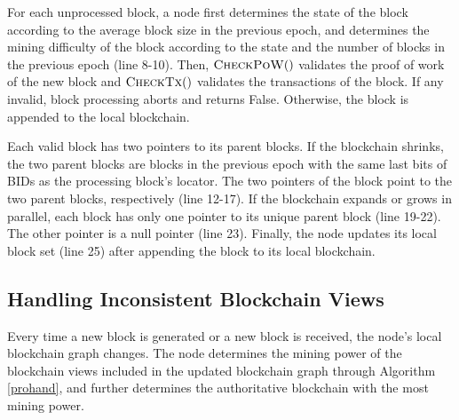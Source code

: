 \documentclass[10pt,journal,compsoc]{IEEEtran}
\renewcommand*\Call[2]{\textproc{#1}(#2)}
\begin{document}
	For each unprocessed block, a node first determines the state of the block according to the average block size in the previous epoch, and determines the mining difficulty of the block according to the state and the number of blocks in the previous epoch (line 8-10). 
	Then, $\Call{CheckPoW}{ } $ validates the proof of work of the new block and $\Call{CheckTx}{ }$ validates the transactions of the block. If any invalid, block processing aborts and returns False. Otherwise, the block is appended to the local blockchain. 
	
	Each valid block has two pointers to its parent blocks. If the blockchain shrinks,  the two parent blocks are blocks in the previous epoch with the same last bits of BIDs as the processing block's locator. The two pointers of the block point to the two parent blocks, respectively (line 12-17). If the blockchain expands or grows in parallel, each block has only one pointer to its unique parent block (line 19-22). The other pointer is a null pointer (line 23). Finally, the node updates its local block set (line 25) after appending the block to its local blockchain.
	
	
	\subsection{Handling Inconsistent Blockchain Views}
	Every time a new block is generated or a new block is received, the node's local blockchain graph changes. 
	The node determines the mining power of the blockchain views included in the updated blockchain graph through Algorithm \ref{prohand}, and further determines the authoritative blockchain with the most mining power.
	
\end{document}
